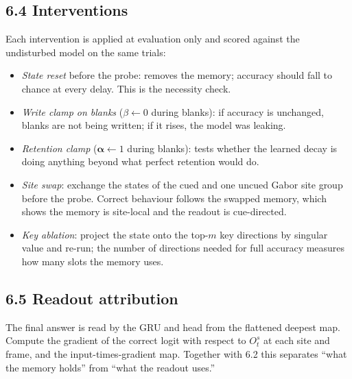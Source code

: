 \documentclass[

]{article}
\providecommand{\tightlist}{%

  \setlength{\itemsep}{0pt}\setlength{\parskip}{0pt}}
\begin{document}
\subsection{6.4 Interventions}\label{interventions}



Each intervention is applied at evaluation only and scored against the undisturbed model on the same trials:



\begin{itemize}

\tightlist

\item

  \emph{State reset} before the probe: removes the memory; accuracy should fall to chance at every delay. This is the necessity check.

\item

  \emph{Write clamp on blanks} (\(\beta\leftarrow0\) during blanks): if accuracy is unchanged, blanks are not being written; if it rises, the model was leaking.

\item

  \emph{Retention clamp} (\(\boldsymbol\alpha\leftarrow1\) during blanks): tests whether the learned decay is doing anything beyond what perfect retention would do.

\item

  \emph{Site swap}: exchange the states of the cued and one uncued Gabor site group before the probe. Correct behaviour follows the swapped memory, which shows the memory is site-local and the readout is cue-directed.

\item

  \emph{Key ablation}: project the state onto the top-\(m\) key directions by singular value and re-run; the number of directions needed for full accuracy measures how many slots the memory uses.

\end{itemize}



\subsection{6.5 Readout attribution}\label{readout-attribution}



The final answer is read by the GRU and head from the flattened deepest map. Compute the gradient of the correct logit with respect to \(O^s_t\) at each site and frame, and the input-times-gradient map. Together with 6.2 this separates ``what the memory holds'' from ``what the readout uses.''
\end{document}
